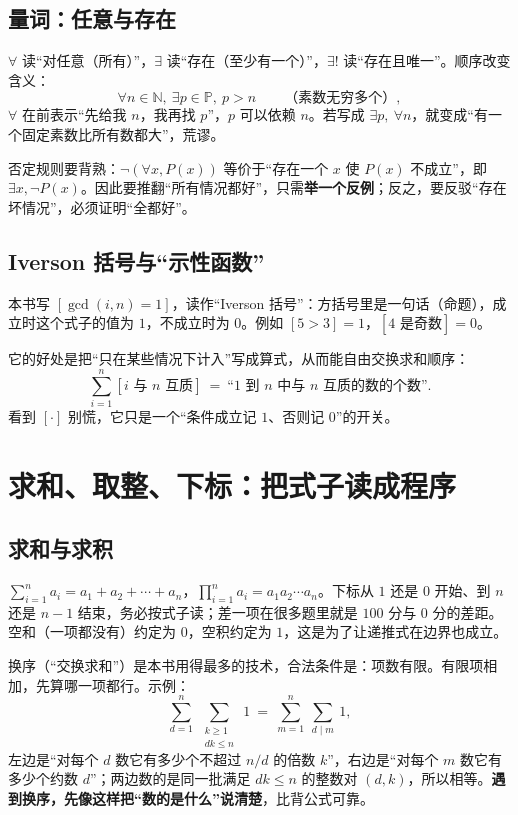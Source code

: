\documentclass[UTF8,a4paper,11pt,twoside,openright,fontset=fandol]{ctexbook}
\theoremstyle{definition}
\newcommand{\N}{\mathbb N}
\newcommand{\Pp}{\mathbb P}
\newcommand{\iva}[1]{\left[#1\right]}
\begin{document}
\subsection{量词：任意与存在}
$\forall$ 读“对任意（所有）”，$\exists$ 读“存在（至少有一个）”，$\exists!$ 读“存在且唯一”。顺序改变含义：
\[
\forall n\in\N,\ \exists p\in\Pp,\ p>n\qquad\text{（素数无穷多个）},
\]
$\forall$ 在前表示“先给我 $n$，我再找 $p$”，$p$ 可以依赖 $n$。若写成 $\exists p,\ \forall n$，就变成“有一个固定素数比所有数都大”，荒谬。

否定规则要背熟：$\lnot(\forall x,P(x))$ 等价于“存在一个 $x$ 使 $P(x)$ 不成立”，即 $\exists x,\lnot P(x)$。因此要推翻“所有情况都好”，只需\textbf{举一个反例}；反之，要反驳“存在坏情况”，必须证明“全都好”。

\subsection{Iverson 括号与“示性函数”}
本书写 $\iva{\gcd(i,n)=1}$，读作“Iverson 括号”：方括号里是一句话（命题），成立时这个式子的值为 $1$，不成立时为 $0$。例如 $\iva{5>3}=1$，$\iva{4\text{ 是奇数}}=0$。

它的好处是把“只在某些情况下计入”写成算式，从而能自由交换求和顺序：
\[
\sum_{i=1}^{n}\iva{i\text{ 与 }n\text{ 互质}}\ =\ \text{“}1\text{ 到 }n\text{ 中与 }n\text{ 互质的数的个数”}.
\]
看到 $\iva{\cdot}$ 别慌，它只是一个“条件成立记 $1$、否则记 $0$”的开关。

\section{求和、取整、下标：把式子读成程序}
\subsection{求和与求积}
$\sum_{i=1}^{n}a_i=a_1+a_2+\cdots+a_n$，$\prod_{i=1}^{n}a_i=a_1a_2\cdots a_n$。下标从 $1$ 还是 $0$ 开始、到 $n$ 还是 $n-1$ 结束，务必按式子读；差一项在很多题里就是 $100$ 分与 $0$ 分的差距。空和（一项都没有）约定为 $0$，空积约定为 $1$，这是为了让递推式在边界也成立。

换序（“交换求和”）是本书用得最多的技术，合法条件是：项数有限。有限项相加，先算哪一项都行。示例：
\[
\sum_{d=1}^{n}\ \sum_{\substack{k\ge 1\\dk\le n}}\ 1\ =\ \sum_{m=1}^{n}\ \sum_{d\mid m}\ 1,
\]
左边是“对每个 $d$ 数它有多少个不超过 $n/d$ 的倍数 $k$”，右边是“对每个 $m$ 数它有多少个约数 $d$”；两边数的是同一批满足 $dk\le n$ 的整数对 $(d,k)$，所以相等。\textbf{遇到换序，先像这样把“数的是什么”说清楚}，比背公式可靠。
\end{document}
